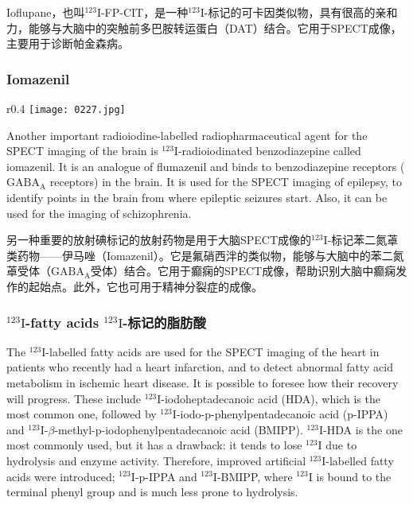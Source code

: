 \documentclass[dvipsnames, svgnames,a4paper,11pt]{article}
\begin{document}
Ioflupane，也叫\(\mathrm{^{123}I}\)-FP-CIT，是一种\(\mathrm{^{123}I}\)-标记的可卡因类似物，具有很高的亲和力，能够与大脑中的突触前多巴胺转运蛋白（DAT）结合。它用于SPECT成像，主要用于诊断帕金森病。

\subsubsection{Iomazenil}  

\begin{wrapfigure}{r}{0.4\textwidth}
    \centering
    \texttt{[image: 0227.jpg]}
     \label{fig301}
\end{wrapfigure}

Another important radioiodine-labelled radiopharmaceutical agent for the SPECT imaging of the brain is \(\mathrm{^{123}I}\)-radioiodinated benzodiazepine called iomazenil. It is an analogue of flumazenil and binds to benzodiazepine receptors (\(\mathrm{GABA_A}\) receptors) in the brain. It is used for the SPECT imaging of epilepsy, to identify points in the brain from where epileptic seizures start. Also, it can be used for the imaging of schizophrenia.  

另一种重要的放射碘标记的放射药物是用于大脑SPECT成像的\(\mathrm{^{123}I}\)-标记苯二氮䓬类药物——伊马唑（Iomazenil）。它是氟硝西泮的类似物，能够与大脑中的苯二氮䓬受体（\(\mathrm{GABA_A}\)受体）结合。它用于癫痫的SPECT成像，帮助识别大脑中癫痫发作的起始点。此外，它也可用于精神分裂症的成像。  

\subsubsection{\(\mathrm{^{123}I}\)-fatty acids \(\mathrm{^{123}I}\)-标记的脂肪酸}  
The \(\mathrm{^{123}I}\)-labelled fatty acids are used for the SPECT imaging of the heart in patients who recently had a heart infarction, and to detect abnormal fatty acid metabolism in ischemic heart disease. It is possible to foresee how their recovery will progress. These include \(\mathrm{^{123}I}\)-iodoheptadecanoic acid (HDA), which is the most common one, followed by \(\mathrm{^{123}I}\)-iodo-\(\mathrm{p}\)-phenylpentadecanoic acid (p-IPPA) and \(\mathrm{^{123}I}\)-\(\beta\)-methyl-\(\mathrm{p}\)-iodophenylpentadecanoic acid (BMIPP). \(\mathrm{^{123}I}\)-HDA is the one most commonly used, but it has a drawback: it tends to lose \(\mathrm{^{123}I}\) due to hydrolysis and enzyme activity. Therefore, improved artificial \(\mathrm{^{123}I}\)-labelled fatty acids were introduced; \(\mathrm{^{123}I}\)-p-IPPA and \(\mathrm{^{123}I}\)-BMIPP, where \(\mathrm{^{123}I}\) is bound to the terminal phenyl group and is much less prone to hydrolysis.
\end{document}
